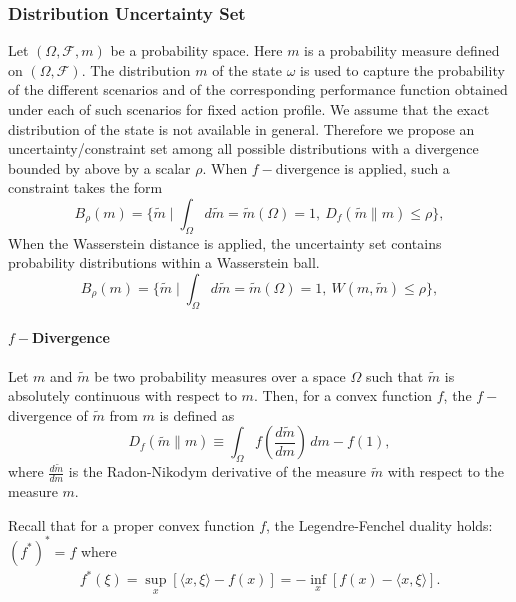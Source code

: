 \documentclass{article}
\begin{document}
\subsubsection{Distribution Uncertainty Set}
Let $(\Omega, \mathcal{F},m)$ be a probability space. Here $m$ is a probability measure defined on $(\Omega, \mathcal{F})$. The distribution $m$ of the state $\omega$ is used to capture the probability of the different scenarios and of the corresponding performance function obtained under each of such scenarios for fixed action profile. We assume that the exact distribution of the state is not available in general. Therefore we propose an uncertainty/constraint set among all possible distributions with a divergence bounded by above by a scalar $\rho$. When $f-$divergence \cite{Csiszar1963,Morimoto1963,Silvey1966} is applied, such a constraint takes the form
\begin{equation}
B_{\rho}(m)=\{ \tilde{m}\mid \int_{\Omega} d\tilde{m}=\tilde{m}(\Omega)=1,\ D_{f}(\tilde{m}\parallel m) \leq \rho\},
\label{eq:setf}
\end{equation}
When the Wasserstein distance \cite{Villani} is applied, the uncertainty set contains probability distributions within a Wasserstein ball.
\begin{equation}
B_{\rho}(m)=\{ \tilde{m}\mid \int_{\Omega} d\tilde{m}=\tilde{m}(\Omega)=1,\ W(m,\tilde{m}) \leq \rho\},
\label{eq:setwass}
\end{equation}

\paragraph{$f-$Divergence}
Let $m$ and $\tilde{m}$ be two probability measures over a space $\Omega$ such that $\tilde{m}$ is absolutely continuous with respect to $m$. Then, for a convex function $f$, the $f-$divergence of $\tilde{m}$ from $m$ is defined as
\begin{equation*}
D_f(\tilde{m}\parallel m) \equiv \int_{\Omega} f\left(\frac{d\tilde{m}}{dm}\right)\,dm - f(1),
\end{equation*}
where $\frac{d\tilde{m}}{dm}$ is the Radon-Nikodym derivative of the measure $\tilde{m}$ with respect to the measure $m$.

Recall that for a proper convex function $f$, the Legendre-Fenchel duality holds: $(f^*)^*=f$ where
\begin{eqnarray}
f^*(\xi) = \sup_{x}[\langle x,\xi\rangle-f(x)] =-\inf_{x}[ f(x)-\langle x,\xi\rangle].
\end{eqnarray}
\end{document}

